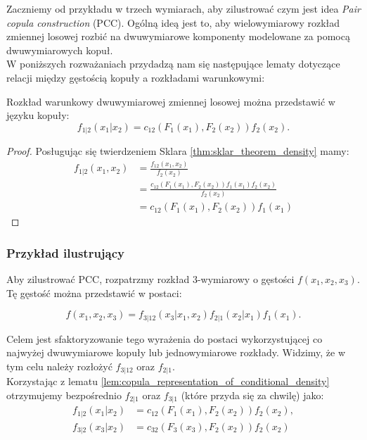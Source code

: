 Zaczniemy od przykładu w trzech wymiarach, aby zilustrować czym jest idea \emph{Pair copula construction} (PCC). Ogólną ideą jest to, aby wielowymiarowy rozkład zmiennej losowej rozbić na dwuwymiarowe komponenty modelowane za pomocą dwuwymiarowych kopuł.\\

W poniższych rozważaniach przydadzą nam się następujące lematy dotyczące relacji między gęstością kopuły a rozkładami warunkowymi:

\begin{lemma}
	Rozkład warunkowy dwuwymiarowej zmiennej losowej można przedstawić w języku kopuły:	
	$$ f_{1|2}(x_1|x_2) =c_{12}(F_1(x_1), F_2(x_2))f_2(x_2).$$
	\label{lem:copula_representation_of_conditional_density}
\end{lemma}
\begin{proof}
	Posługując się twierdzeniem Sklara \ref{thm:sklar_theorem_density} mamy:
	\begin{equation*}
		\begin{split}
			f_{1|2}(x_1, x_2) & = \frac{f_{12}(x_1, x_2)}{f_2(x_2)} \\
			& = \frac{c_{12}(F_1(x_1), F_2(x_2))f_1(x_1)f_2(x_2)}{f_2(x_2)}\\
			& = c_{12}(F_1(x_1), F_2(x_2))f_1(x_1)
		\end{split}
	\end{equation*}
\end{proof}

\subsubsection{Przykład ilustrujący}
\label{subsub:przyklad_3_wymiary}
Aby zilustrować PCC, rozpatrzmy rozkład $3$-wymiarowy o gęstości $f(x_1, x_2, x_3)$. Tę gęstość można przedstawić w postaci:

$$ f(x_1, x_2, x_3) = f_{3|12}(x_3|x_1, x_2)f_{2|1}(x_2|x_1)f_1(x_1).$$

Celem jest sfaktoryzowanie tego wyrażenia do postaci wykorzystującej co najwyżej dwuwymiarowe kopuły lub jednowymiarowe rozkłady. Widzimy, że w tym celu należy rozłożyć $f_{3|12}$ oraz $f_{2|1}$. \\
Korzystając z lematu \ref{lem:copula_representation_of_conditional_density} otrzymujemy bezpośrednio $f_{2|1}$ oraz $f_{3|1}$ (które przyda się za chwilę) jako:
\begin{equation*}
	\begin{split}
		f_{1|2}(x_1|x_2) &= c_{12}(F_1(x_1), F_2(x_2))f_2(x_2),\\
		f_{3|2}(x_3|x_2) &= c_{32}(F_3(x_3), F_2(x_2))f_2(x_2)
	\end{split}
\end{equation*}

